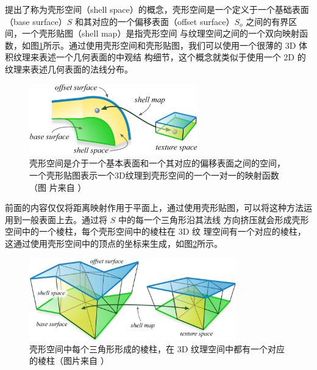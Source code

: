\cite{a:Shell-Maps}提出了称为壳形空间（shell space）的概念，壳形空间是一个定义于一个基础表面（base surface）$S$ 和其对应的一个偏移表面（offset surface）$S_o$ 之间的有界区间，一个壳形贴图（shell map）是指壳形空间 与纹理空间之间的一个双向映射函数，如图\ref{f:df-shell-maps-1}所示。通过使用壳形空间和壳形贴图，我们可以使用一个很薄的 3D 体积纹理来表述一个几何表面的中观结 构细节，这个概念就类似于使用一个 2D 的纹理来表述几何表面的法线分布。

\begin{figure}
	\sidecaption
	\includegraphics[width=0.65\textwidth]{figures/df/shell-maps-1}
	\caption{壳形空间是介于一个基本表面和一个其对应的偏移表面之间的空间，一个壳形贴图表示一个3D纹理到壳形空间的一个一对一的映射函数（图 片来自 \cite{a:Shell-Maps}）}
	\label{f:df-shell-maps-1}
\end{figure}

前面的内容仅仅将距离映射作用于平面上，通过使用壳形贴图，可以将这种方法运用到一般表面上去。通过将 $S$ 中的每一个三角形沿其法线 方向挤压就会形成壳形空间中的一个棱柱，每个壳形空间中的棱柱在 3D 纹 理空间有一个对应的棱柱，这通过使用壳形空间中的顶点的坐标来生成，如图\ref{f:df-shell-maps-2}所示。

\begin{figure}
\begin{center}
	\includegraphics[width=0.8\textwidth]{figures/df/shell-maps-2}
	\end{center}
	\caption{壳形空间中每个三角形形成的棱柱，在 3D 纹理空间中都有一个对应的棱柱（图片来自 \cite{a:Shell-Maps}）}
	\label{f:df-shell-maps-2}
\end{figure}


